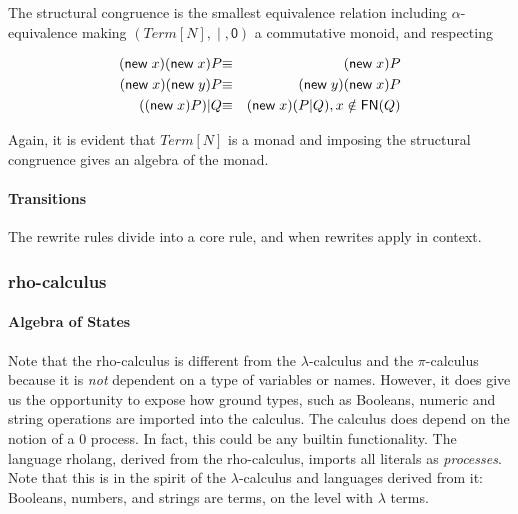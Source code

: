 The structural congruence is the smallest equivalence relation including $\alpha$-equivalence making $(Term[N],\;\mathsf{|}\;,\mathsf{0})$ a commutative monoid, and respecting

\begin{eqnarray*}
  \mathsf{(}\mathsf{new}\; x\mathsf{)}\mathsf{(}\mathsf{new}\; x\mathsf{)}P & \mathsf{\equiv} & \mathsf{(}\mathsf{new}\; x\mathsf{)}P \\
  \mathsf{(}\mathsf{new}\; x\mathsf{)}\mathsf{(}\mathsf{new}\; y\mathsf{)}P & \mathsf{\equiv} & \mathsf{(}\mathsf{new}\; y\mathsf{)}\mathsf{(}\mathsf{new}\; x\mathsf{)}P \\
  (\mathsf{(}\mathsf{new}\; x\mathsf{)}P)\mathsf{|}Q & \mathsf{\equiv} & \mathsf{(}\mathsf{new}\; x\mathsf{)}(P\mathsf{|}Q), x \notin \mathsf{FN}(Q)
\end{eqnarray*}

Again, it is evident that $Term[N]$ is a monad and imposing the structural congruence gives an algebra of the monad.

\paragraph{Transitions}
The rewrite rules divide into a core rule, and when rewrites apply in
context.

\subsubsection{rho-calculus}

\paragraph{Algebra of States}
Note that the rho-calculus is different from the $\lambda$-calculus and the $\pi$-calculus because it is \emph{not} dependent on a type of variables or names. However, it does give us the opportunity to expose how ground types, such as Booleans, numeric and string operations are imported into the calculus. The calculus does depend on the notion of a $0$ process. In fact, this could be any builtin functionality. The language rholang, derived from the rho-calculus, imports all literals as \emph{processes}. Note that this is in the spirit of the $\lambda$-calculus and languages derived from it: Booleans, numbers, and strings are terms, on the level with $\lambda$ terms.

